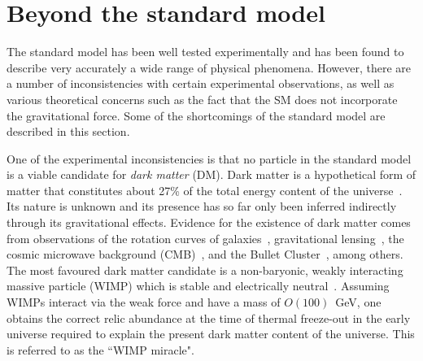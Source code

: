 \section{Beyond the standard model}
\label{sec:theory-bsm}
The standard model has been well tested experimentally and has been found to 
describe very accurately a wide range of physical phenomena. However, there are 
a number of inconsistencies with certain experimental observations, as well as 
various theoretical concerns such as the fact that the SM does not incorporate 
the gravitational force. Some of the shortcomings of the standard model are 
described in this section.


One of the experimental inconsistencies is that no particle in the standard 
model is a viable candidate for \textit{dark matter} (DM). Dark matter is a 
hypothetical form of matter that constitutes about 27\% of the total energy 
content of the universe~\cite{planck15}. Its nature is unknown and its presence 
has so far only been inferred indirectly through its gravitational effects. 
Evidence for the existence of dark matter comes from observations of the 
rotation curves of galaxies~\cite{zwicky37}, gravitational 
lensing~\cite{lensing90}, the cosmic microwave background 
(CMB)~\cite{planck15,wmap9}, and the Bullet Cluster~\cite{bullet06}, among 
others. 
The most favoured dark matter candidate is a non-baryonic, weakly interacting 
massive particle (WIMP) which is stable and electrically neutral~\cite{wimp}.
Assuming WIMPs interact via the weak force and have a mass of $O(100)$~GeV, one 
obtains the correct relic abundance at the time of thermal freeze-out in the 
early universe required to explain the present dark matter content of the 
universe. 
This is referred to as the ``WIMP miracle".

